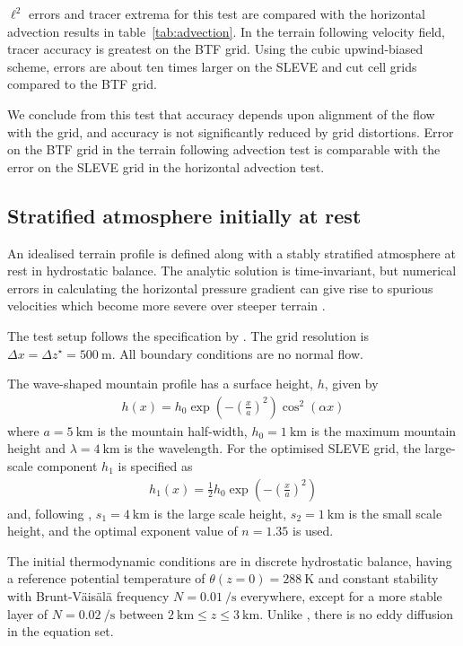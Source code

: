 \documentclass[twocol]{ametsoc}
\begin{document}
$\ell^2$ errors and tracer extrema for this test are compared with the horizontal advection results in table~\ref{tab:advection}.  In the terrain following velocity field, tracer accuracy is greatest on the BTF grid.  Using the cubic upwind-biased scheme, errors are about ten times larger on the SLEVE and cut cell grids compared to the BTF grid.

We conclude from this test that accuracy depends upon alignment of the flow with the grid, and accuracy is not significantly reduced by grid distortions.  Error on the BTF grid in the terrain following advection test is comparable with the error on the SLEVE grid in the horizontal advection test.

\subsection{Stratified atmosphere initially at rest}
\label{sec:resting}

An idealised terrain profile is defined along with a stably stratified atmosphere at rest in hydrostatic balance.  The analytic solution is time-invariant, but numerical errors in calculating the horizontal pressure gradient can give rise to spurious velocities which become more severe over steeper terrain \citep{klemp2011}.

The test setup follows the specification by \cite{klemp2011}.  The grid resolution is \(\Delta x = \Delta z^\star = \SI{500}{\meter}\).  All boundary conditions are no normal flow.

The wave-shaped mountain profile has a surface height, $h$, given by
\begin{align}
	h(x) = h_0 \exp \left( - \left( \frac{x}{a} \right)^2 \right) \cos^2 \left( \alpha x \right) \label{eqn:resting:mountain}
\end{align}
where $a = \SI{5}{\kilo\meter}$ is the mountain half-width, $h_0 = \SI{1}{\kilo\meter}$ is the maximum mountain height and $\lambda = \SI{4}{\kilo\meter}$ is the wavelength.  For the optimised SLEVE grid, the large-scale component $h_1$ is specified as
\begin{align}
h_1(x) = \frac{1}{2} h_0 \exp \left( - \left( \frac{x}{a} \right)^2 \right)
\end{align}
and, following \cite{leuenberger2010}, $s_1 = \SI{4}{\kilo\meter}$ is the large scale height, $s_2 = \SI{1}{\kilo\meter}$ is the small scale height, and the optimal exponent value of $n = 1.35$ is used.

The initial thermodynamic conditions are in discrete hydrostatic balance, having a reference potential temperature of $\theta(z = 0) = \SI{288}{\kelvin}$ and constant stability with Brunt-V\"ais\"al\"a frequency $N = \SI{0.01}{\per\second}$ everywhere, except for a more stable layer of $N = \SI{0.02}{\per\second}$ between $\SI{2}{\kilo\meter} \leq z \leq \SI{3}{\kilo\meter}$.  Unlike \citet{klemp2011}, there is no eddy diffusion in the equation set.
\end{document}

